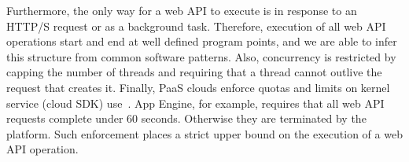 Furthermore, the only way for a web API to execute is in response
to an HTTP/S request or as a background task.  Therefore, execution of
all web API operations start and end at well defined program points, and
we are able to infer this structure from common software patterns.  Also,
concurrency is restricted by capping the number of threads
and requiring that a thread cannot outlive the request
that creates it.  Finally, PaaS clouds enforce quotas and limits on kernel service
(cloud SDK) use~\cite{azure-limits,gae-limits,gae-sandbox}.
App Engine, for example, requires that all web API requests complete under 60 seconds.
Otherwise they are terminated by the platform. 
Such enforcement places a strict upper bound on the
execution of a web API operation.
